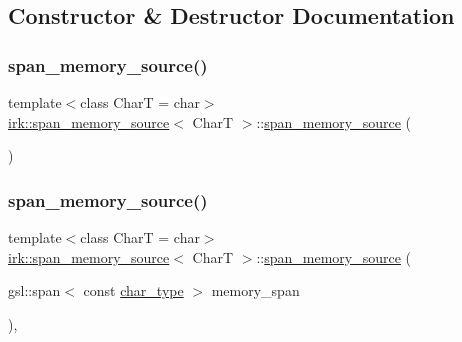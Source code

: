 \subsection{Constructor \& Destructor Documentation}
\mbox{\label{classirk_1_1span__memory__source_a39cae60a3e106cb9cb977b46e540c8b3}} 
\subsubsection{\texorpdfstring{span\+\_\+memory\+\_\+source()}{span\_memory\_source()}\hspace{0.1cm}{\footnotesize\ttfamily [1/2]}}
{\footnotesize\ttfamily template$<$class CharT  = char$>$ \\
\mbox{\hyperlink{classirk_1_1span__memory__source}{irk\+::span\+\_\+memory\+\_\+source}}$<$ CharT $>$\+::\mbox{\hyperlink{classirk_1_1span__memory__source}{span\+\_\+memory\+\_\+source}} (\begin{DoxyParamCaption}{ }\end{DoxyParamCaption})\hspace{0.3cm}{\ttfamily [default]}}

\mbox{\label{classirk_1_1span__memory__source_a4de152530448b9a46951d99320333ca9}} 
\subsubsection{\texorpdfstring{span\+\_\+memory\+\_\+source()}{span\_memory\_source()}\hspace{0.1cm}{\footnotesize\ttfamily [2/2]}}
{\footnotesize\ttfamily template$<$class CharT  = char$>$ \\
\mbox{\hyperlink{classirk_1_1span__memory__source}{irk\+::span\+\_\+memory\+\_\+source}}$<$ CharT $>$\+::\mbox{\hyperlink{classirk_1_1span__memory__source}{span\+\_\+memory\+\_\+source}} (\begin{DoxyParamCaption}\item[{gsl\+::span$<$ const \mbox{\hyperlink{classirk_1_1span__memory__source_a769d88b11f7c2882a006e93edb2cdb79}{char\+\_\+type}} $>$}]{memory\+\_\+span }\end{DoxyParamCaption})\hspace{0.3cm}{\ttfamily [inline]}, {\ttfamily [explicit]}}



